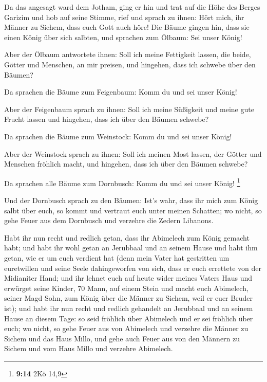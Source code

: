  Da das angesagt ward dem Jotham, ging er hin und trat auf
die Höhe des Berges Garizim und hob auf seine Stimme, rief und sprach zu
ihnen: Hört mich, ihr Männer zu Sichem, dass euch Gott auch höre!
 Die Bäume gingen hin, dass sie einen König über sich
salbten, und sprachen zum Ölbaum: Sei unser König!

 Aber der Ölbaum antwortete ihnen: Soll ich meine
Fettigkeit lassen, die beide, Götter und Menschen, an mir preisen, und
hingehen, dass ich schwebe über den Bäumen?

 Da sprachen die Bäume zum Feigenbaum: Komm du und sei
unser König!

 Aber der Feigenbaum sprach zu ihnen: Soll ich meine
Süßigkeit und meine gute Frucht lassen und hingehen, dass ich über den
Bäumen schwebe?

 Da sprachen die Bäume zum Weinstock: Komm du und sei
unser König!

 Aber der Weinstock sprach zu ihnen: Soll ich meinen Most
lassen, der Götter und Menschen fröhlich macht, und hingehen, dass ich
über den Bäumen schwebe?

 Da sprachen alle Bäume zum Dornbusch: Komm du und sei
unser König! \footnote{\textbf{9:14} 2Kö 14,9}

 Und der Dornbusch sprach zu den Bäumen: Ist's wahr, dass
ihr mich zum König salbt über euch, so kommt und vertraut euch unter
meinen Schatten; wo nicht, so gehe Feuer aus dem Dornbusch und verzehre
die Zedern Libanons.

 Habt ihr nun recht und redlich getan, dass ihr Abimelech
zum König gemacht habt; und habt ihr wohl getan an Jerubbaal und an
seinem Hause und habt ihm getan, wie er um euch verdient hat
 (denn mein Vater hat gestritten um euretwillen und seine
Seele dahingeworfen von sich, dass er euch errettete von der Midianiter
Hand;  und ihr lehnet euch auf heute wider meines Vaters
Haus und erwürget seine Kinder, 70 Mann, auf einem Stein und macht euch
Abimelech, seiner Magd Sohn, zum König über die Männer zu Sichem, weil
er euer Bruder ist);  und habt ihr nun recht und redlich
gehandelt an Jerubbaal und an seinem Hause an diesem Tage: so seid
fröhlich über Abimelech und er sei fröhlich über euch; 
wo nicht, so gehe Feuer aus von Abimelech und verzehre die Männer zu
Sichem und das Haus Millo, und gehe auch Feuer aus von den Männern zu
Sichem und vom Haus Millo und verzehre Abimelech.

